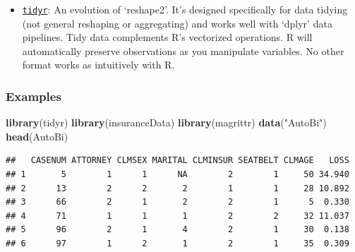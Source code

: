 \documentclass[]{book}
\newenvironment{Shaded}{\begin{snugshade}}{\end{snugshade}}
\newcommand{\KeywordTok}[1]{\textcolor[rgb]{0.13,0.29,0.53}{\textbf{{#1}}}}
\newcommand{\DataTypeTok}[1]{\textcolor[rgb]{0.13,0.29,0.53}{{#1}}}
\newcommand{\StringTok}[1]{\textcolor[rgb]{0.31,0.60,0.02}{{#1}}}
\newcommand{\CommentTok}[1]{\textcolor[rgb]{0.56,0.35,0.01}{\textit{{#1}}}}
\newcommand{\NormalTok}[1]{{#1}}
\providecommand{\tightlist}{%
  \setlength{\itemsep}{0pt}\setlength{\parskip}{0pt}}
\begin{document}
\begin{itemize}
\tightlist
\item
  \href{https://cran.r-project.org/web/packages/tidyr/index.html}{\texttt{tidyr}}:
  An evolution of `reshape2'. It's designed specifically for data
  tidying (not general reshaping or aggregating) and works well with
  `dplyr' data pipelines. Tidy data complements R's vectorized
  operations. R will automatically preserve observations as you
  manipulate variables. No other format works as intuitively with R.
\end{itemize}

\subsubsection{\texorpdfstring{\textbf{Examples
}}{Examples }}\label{examples-11}

\begin{Shaded}
\begin{Highlighting}[]
\KeywordTok{library}\NormalTok{(tidyr)}
\KeywordTok{library}\NormalTok{(insuranceData)}
\KeywordTok{library}\NormalTok{(magrittr)}
\KeywordTok{data}\NormalTok{(}\StringTok{"AutoBi"}\NormalTok{)}
\KeywordTok{head}\NormalTok{(AutoBi)}
\end{Highlighting}
\end{Shaded}

\begin{verbatim}
##   CASENUM ATTORNEY CLMSEX MARITAL CLMINSUR SEATBELT CLMAGE   LOSS
## 1       5        1      1      NA        2        1     50 34.940
## 2      13        2      2       2        1        1     28 10.892
## 3      66        2      1       2        2        1      5  0.330
## 4      71        1      1       1        2        2     32 11.037
## 5      96        2      1       4        2        1     30  0.138
## 6      97        1      2       1        2        1     35  0.309
\end{verbatim}

\begin{Shaded}
\end{Shaded}
\end{document}

